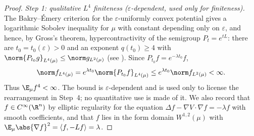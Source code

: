 \documentclass[../main.tex]{subfiles}
\begin{document}
\begin{proof}
\noindent\emph{Step 1: qualitative $L^4$ finiteness ($\varepsilon$-dependent, used only
for finiteness).}
The Bakry--\'Emery criterion \cite{BakryEmery1985} for the $\varepsilon$-uniformly
convex potential gives a logarithmic Sobolev inequality for $\mu$ with constant
depending only on $\varepsilon$, and hence, by Gross's theorem, hypercontractivity of
the semigroup $P_t=e^{tL}$: there are $t_0=t_0(\varepsilon)>0$ and an exponent
$q(t_0)\ge4$ with $\norm{P_{t_0}g}_{L^4(\mu)}\le\norm g_{L^2(\mu)}$ (see
\cite[Ch.~5]{BakryGentilLedoux2014}).  Since $P_{t_0}f=e^{-\lambda t_0}f$,
\[
  \norm f_{L^4(\mu)}=e^{\lambda t_0}\norm{P_{t_0}f}_{L^4(\mu)}
  \le e^{\lambda t_0}\norm f_{L^2(\mu)}<\infty .
\]
Thus $\E_\mu f^4<\infty$.  The bound is $\varepsilon$-dependent and is used only to
license the rearrangement in Step~4; no quantitative use is made of it.  We also
record that $f\in C^\infty(\R^n)$ by elliptic regularity for the equation
$\Delta f-\nabla V\cdot\nabla f=-\lambda f$ with smooth coefficients, and that
$f$ lies in the form domain $W^{1,2}(\mu)$ with
$\E_\mu\abs{\nabla f}^2=\langle f,-Lf\rangle=\lambda$.


\end{proof}
\end{document}
